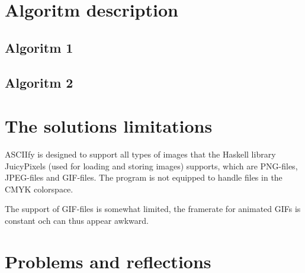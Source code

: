 \documentclass[12pt, a4paper]{article}
\begin{document}



	\section{Algoritm description}

		\subsection{Algoritm 1}

		\subsection{Algoritm 2}

	\section{The solutions limitations}

	ASCIIfy is designed to support all types of images that the Haskell library JuicyPixels (used for loading and storing images) supports, which are PNG-files, JPEG-files and GIF-files. The program is not equipped to handle files in the CMYK colorspace.

	The support of GIF-files is somewhat limited, the framerate for animated GIFs is constant och can thus appear awkward.



	\section{Problems and reflections}
\end{document}
